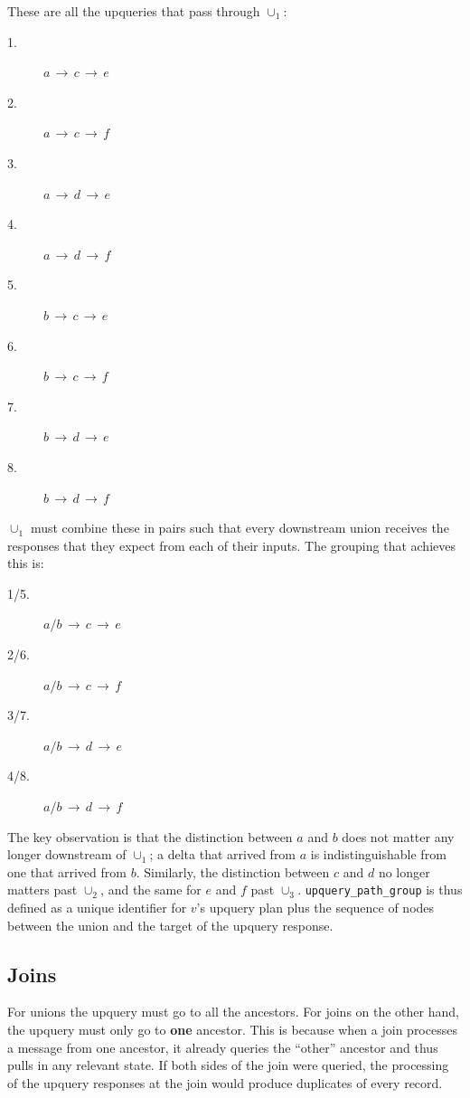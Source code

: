 These are all the upqueries that pass through $\cup_1$:
        
\begin{multicols}{4}
\begin{description}
  \item [1.] $a\,\to\,c\,\to\,e$
  \item [2.] $a\,\to\,c\,\to\,f$
  \item [3.] $a\,\to\,d\,\to\,e$
  \item [4.] $a\,\to\,d\,\to\,f$
  \item [5.] $b\,\to\,c\,\to\,e$
  \item [6.] $b\,\to\,c\,\to\,f$
  \item [7.] $b\,\to\,d\,\to\,e$
  \item [8.] $b\,\to\,d\,\to\,f$
\end{description}
\end{multicols}

$\cup_1$ must combine these in pairs such that every downstream union receives
the responses that they expect from each of their inputs. The grouping that
achieves this is:

\begin{multicols}{2}
\begin{description}
  \item [1/5.] $a/b\,\to\,c\,\to\,e$
  \item [2/6.] $a/b\,\to\,c\,\to\,f$
  \item [3/7.] $a/b\,\to\,d\,\to\,e$
  \item [4/8.] $a/b\,\to\,d\,\to\,f$
\end{description}
\end{multicols}

The key observation is that the distinction between $a$ and $b$ does not matter
any longer downstream of $\cup_1$; a delta that arrived from $a$ is
indistinguishable from one that arrived from $b$. Similarly, the distinction
between $c$ and $d$ no longer matters past $\cup_2$, and the same for $e$ and
$f$ past $\cup_3$. \texttt{upquery\_path\_group} is thus defined as a unique
identifier for $v$'s upquery plan plus the sequence of nodes between the union
and the target of the upquery response.

\subsection{Joins}

For unions the upquery must go to all the ancestors. For joins on the other
hand, the upquery must only go to \textbf{one} ancestor. This is because when a
join processes a message from one ancestor, it already queries the ``other''
ancestor and thus pulls in any relevant state. If both sides of the join were
queried, the processing of the upquery responses at the join would produce
duplicates of every record.

